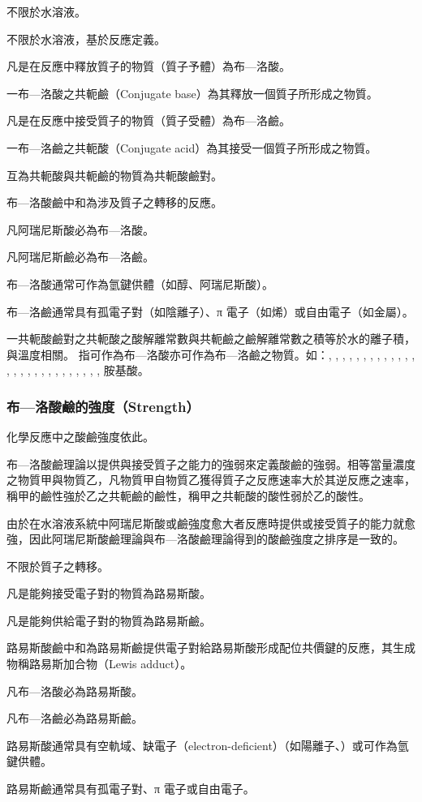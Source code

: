 \documentclass[a4paper,12pt]{article}
\begin{document}
不限於水溶液。
\bit
\item 不限於水溶液，基於反應定義。
\item 凡是在反應中釋放質子的物質（質子予體）為布—洛酸。
\item 一布—洛酸之共軛鹼（Conjugate base）為其釋放一個質子所形成之物質。
\item 凡是在反應中接受質子的物質（質子受體）為布—洛鹼。
\item 一布—洛鹼之共軛酸（Conjugate acid）為其接受一個質子所形成之物質。
\item 互為共軛酸與共軛鹼的物質為共軛酸鹼對。
\item 布—洛酸鹼中和為涉及質子之轉移的反應。
\eit
{}
\bit
\item 凡阿瑞尼斯酸必為布—洛酸。
\item 凡阿瑞尼斯鹼必為布—洛鹼。
\item 布—洛酸通常可作為氫鍵供體（如醇、阿瑞尼斯酸）。
\item 布—洛鹼通常具有孤電子對（如陰離子）、π 電子（如烯）或自由電子（如金屬）。
\item 一共軛酸鹼對之共軛酸之酸解離常數與共軛鹼之鹼解離常數之積等於水的離子積，與溫度相關。
\eit
{}
指可作為布—洛酸亦可作為布—洛鹼之物質。如：, , , , , , , , , , , , , , , , , , , , , , , , , , , 胺基酸。
\subsubsection{布—洛酸鹼的強度（Strength）}
化學反應中之酸鹼強度依此。

布—洛酸鹼理論以提供與接受質子之能力的強弱來定義酸鹼的強弱。相等當量濃度之物質甲與物質乙，凡物質甲自物質乙獲得質子之反應速率大於其逆反應之速率，稱甲的鹼性強於乙之共軛鹼的鹼性，稱甲之共軛酸的酸性弱於乙的酸性。

由於在水溶液系統中阿瑞尼斯酸或鹼強度愈大者反應時提供或接受質子的能力就愈強，因此阿瑞尼斯酸鹼理論與布—洛酸鹼理論得到的酸鹼強度之排序是一致的。
\bit
\item 不限於質子之轉移。
\item 凡是能夠接受電子對的物質為路易斯酸。
\item 凡是能夠供給電子對的物質為路易斯鹼。
\item 路易斯酸鹼中和為路易斯鹼提供電子對給路易斯酸形成配位共價鍵的反應，其生成物稱路易斯加合物（Lewis adduct）。
\eit
{}
\bit
\item 凡布—洛酸必為路易斯酸。
\item 凡布—洛鹼必為路易斯鹼。
\item 路易斯酸通常具有空軌域、缺電子（electron-deficient）（如陽離子、）或可作為氫鍵供體。
\item 路易斯鹼通常具有孤電子對、π 電子或自由電子。
\eit
\end{document}
